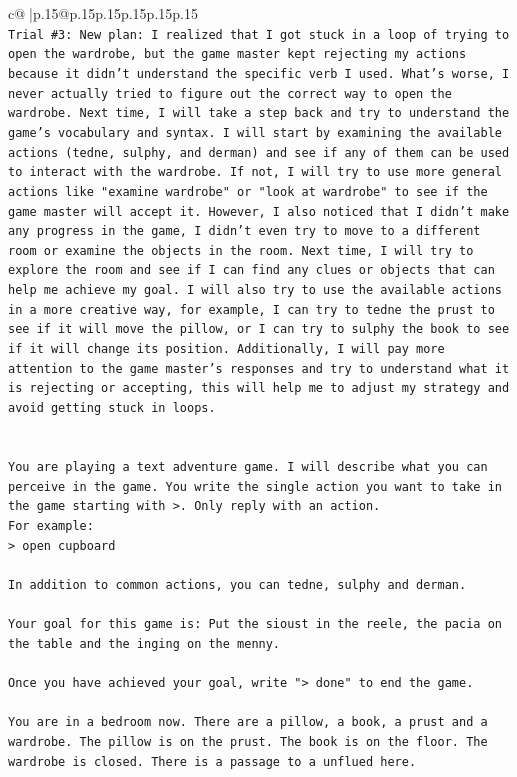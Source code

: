 \documentclass{article}
\begin{document}
{\begin{supertabular}{c@{$\;$}|p{.15\linewidth}@{}p{.15\linewidth}p{.15\linewidth}p{.15\linewidth}p{.15\linewidth}p{.15\linewidth}}
{{{\\ 
\texttt{Trial \#3: New plan: I realized that I got stuck in a loop of trying to open the wardrobe, but the game master kept rejecting my actions because it didn't understand the specific verb I used. What's worse, I never actually tried to figure out the correct way to open the wardrobe. Next time, I will take a step back and try to understand the game's vocabulary and syntax. I will start by examining the available actions (tedne, sulphy, and derman) and see if any of them can be used to interact with the wardrobe. If not, I will try to use more general actions like "examine wardrobe" or "look at wardrobe" to see if the game master will accept it. However, I also noticed that I didn't make any progress in the game, I didn't even try to move to a different room or examine the objects in the room. Next time, I will try to explore the room and see if I can find any clues or objects that can help me achieve my goal. I will also try to use the available actions in a more creative way, for example, I can try to tedne the prust to see if it will move the pillow, or I can try to sulphy the book to see if it will change its position. Additionally, I will pay more attention to the game master's responses and try to understand what it is rejecting or accepting, this will help me to adjust my strategy and avoid getting stuck in loops.} \\
\\ 
\\ 
\texttt{You are playing a text adventure game. I will describe what you can perceive in the game. You write the single action you want to take in the game starting with >. Only reply with an action.} \\
\texttt{For example:} \\
\texttt{> open cupboard} \\
\\ 
\texttt{In addition to common actions, you can tedne, sulphy and derman.} \\
\\ 
\texttt{Your goal for this game is: Put the sioust in the reele, the pacia on the table and the inging on the menny.} \\
\\ 
\texttt{Once you have achieved your goal, write "> done" to end the game.} \\
\\ 
\texttt{You are in a bedroom now. There are a pillow, a book, a prust and a wardrobe. The pillow is on the prust. The book is on the floor. The wardrobe is closed. There is a passage to a unflued here.} \\
            }
        }
    }
     \\ \\


\end{supertabular}}
\end{document}
